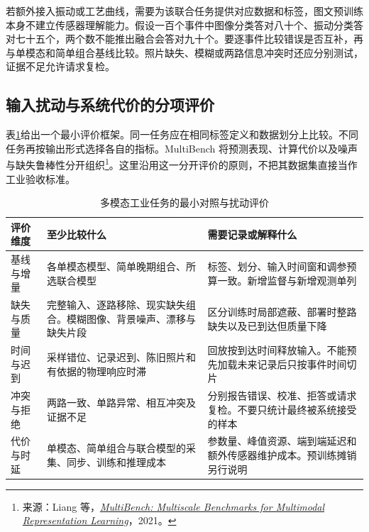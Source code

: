 若额外接入振动或工艺曲线，需要为该联合任务提供对应数据和标签，图文预训练本身不建立传感器理解能力。假设一百个事件中图像分类答对八十个、振动分类答对七十五个，两个数不能推出融合会答对九十个。要逐事件比较错误是否互补，再与单模态和简单组合基线比较。照片缺失、模糊或两路信息冲突时还应分别测试，证据不足允许请求复检。

\subsection{输入扰动与系统代价的分项评价}
表\ref{tab:multimodal-evaluation-protocol}给出一个最小评价框架。同一任务应在相同标签定义和数据划分上比较。不同任务再按输出形式选择各自的指标。MultiBench 将预测表现、计算代价以及噪声与缺失鲁棒性分开组织\footnote{来源：Liang 等，\href{https://datasets-benchmarks-proceedings.neurips.cc/paper/2021/hash/37693cfc748049e45d87b8c7d8b9aacd-Abstract-round1.html}{\textit{MultiBench: Multiscale Benchmarks for Multimodal Representation Learning}}，2021。}。这里沿用这一分开评价的原则，不把其数据集直接当作工业验收标准。

\begin{table}[H]
\centering
\caption{多模态工业任务的最小对照与扰动评价}
\label{tab:multimodal-evaluation-protocol}
\small
\setlength{\tabcolsep}{3pt}
\begin{tabular}{@{}>{\raggedright\arraybackslash}m{2.4cm}>{\raggedright\arraybackslash}m{4.6cm}>{\raggedright\arraybackslash}m{4.9cm}@{}}
\toprule
评价维度 & 至少比较什么 & 需要记录或解释什么 \\
\midrule
基线与增量 & 各单模态模型、简单晚期组合、所选联合模型 & 标签、划分、输入时间窗和调参预算一致。新增监督与新增观测单列 \\
缺失与质量 & 完整输入、逐路移除、现实缺失组合。模糊图像、背景噪声、漂移与缺失片段 & 区分训练时局部遮蔽、部署时整路缺失以及已到达但质量下降 \\
时间与迟到 & 采样错位、记录迟到、陈旧照片和有依据的物理响应时滞 & 回放按到达时间释放输入。不能预先加载未来记录后只按事件时间切片 \\
冲突与拒绝 & 两路一致、单路异常、相互冲突及证据不足 & 分别报告错误、校准、拒答或请求复检。不要只统计最终被系统接受的样本 \\
代价与时延 & 单模态、简单组合与联合模型的采集、同步、训练和推理成本 & 参数量、峰值资源、端到端延迟和额外传感器维护成本。预训练摊销另行说明 \\
\bottomrule
\end{tabular}
\end{table}

